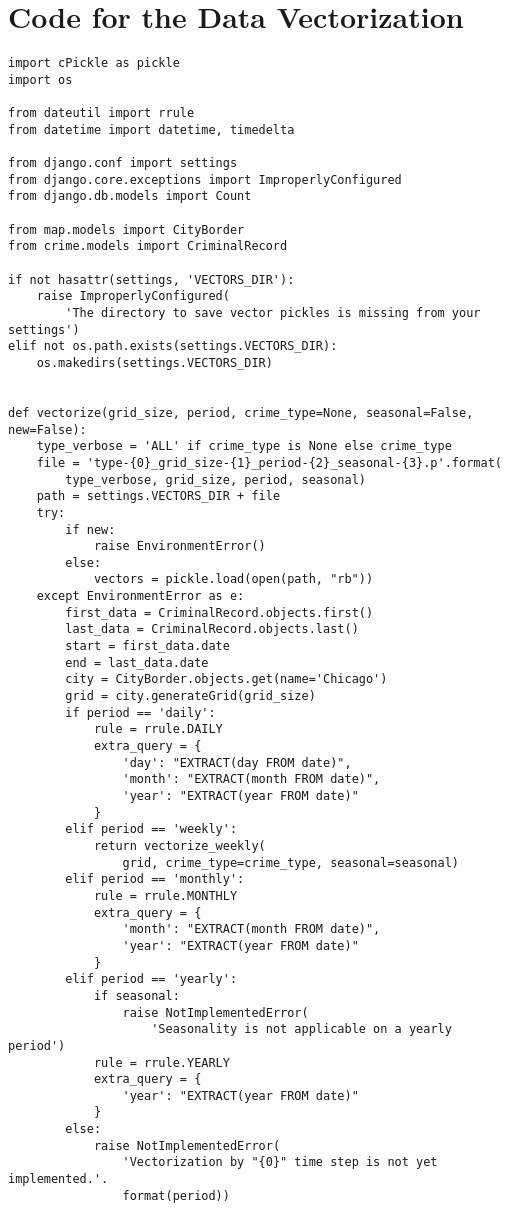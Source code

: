 \chapter{Code for the Data Vectorization} \label{code-vectorization}
\begin{small}
\begin{verbatim}
import cPickle as pickle
import os

from dateutil import rrule
from datetime import datetime, timedelta

from django.conf import settings
from django.core.exceptions import ImproperlyConfigured
from django.db.models import Count

from map.models import CityBorder
from crime.models import CriminalRecord

if not hasattr(settings, 'VECTORS_DIR'):
    raise ImproperlyConfigured(
        'The directory to save vector pickles is missing from your settings')
elif not os.path.exists(settings.VECTORS_DIR):
    os.makedirs(settings.VECTORS_DIR)


def vectorize(grid_size, period, crime_type=None, seasonal=False, new=False):
    type_verbose = 'ALL' if crime_type is None else crime_type
    file = 'type-{0}_grid_size-{1}_period-{2}_seasonal-{3}.p'.format(
        type_verbose, grid_size, period, seasonal)
    path = settings.VECTORS_DIR + file
    try:
        if new:
            raise EnvironmentError()
        else:
            vectors = pickle.load(open(path, "rb"))
    except EnvironmentError as e:
        first_data = CriminalRecord.objects.first()
        last_data = CriminalRecord.objects.last()
        start = first_data.date
        end = last_data.date
        city = CityBorder.objects.get(name='Chicago')
        grid = city.generateGrid(grid_size)
        if period == 'daily':
            rule = rrule.DAILY
            extra_query = {
                'day': "EXTRACT(day FROM date)",
                'month': "EXTRACT(month FROM date)",
                'year': "EXTRACT(year FROM date)"
            }
        elif period == 'weekly':
            return vectorize_weekly(
                grid, crime_type=crime_type, seasonal=seasonal)
        elif period == 'monthly':
            rule = rrule.MONTHLY
            extra_query = {
                'month': "EXTRACT(month FROM date)",
                'year': "EXTRACT(year FROM date)"
            }
        elif period == 'yearly':
            if seasonal:
                raise NotImplementedError(
                    'Seasonality is not applicable on a yearly period')
            rule = rrule.YEARLY
            extra_query = {
                'year': "EXTRACT(year FROM date)"
            }
        else:
            raise NotImplementedError(
                'Vectorization by "{0}" time step is not yet implemented.'.
                format(period))


\end{verbatim}
\end{small}
